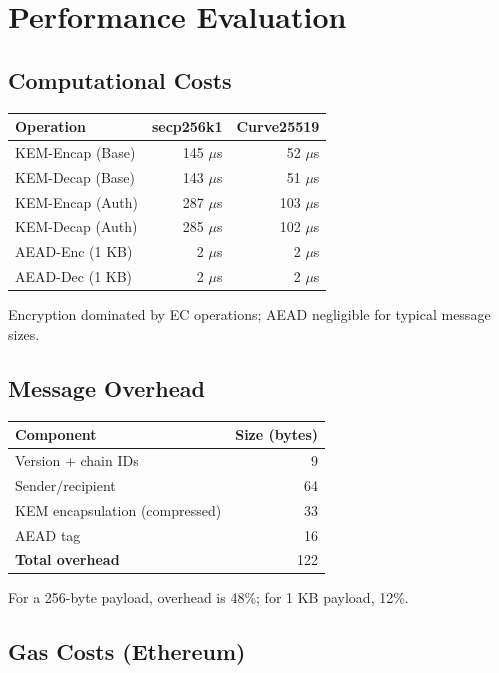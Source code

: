 \documentclass[11pt,a4paper]{article}
\begin{document}
\section{Performance Evaluation}

\subsection{Computational Costs}

\begin{center}
\begin{tabular}{|l|r|r|}
\hline
\textbf{Operation} & \textbf{secp256k1} & \textbf{Curve25519} \\
\hline
KEM-Encap (Base) & 145 $\mu$s & 52 $\mu$s \\
KEM-Decap (Base) & 143 $\mu$s & 51 $\mu$s \\
KEM-Encap (Auth) & 287 $\mu$s & 103 $\mu$s \\
KEM-Decap (Auth) & 285 $\mu$s & 102 $\mu$s \\
AEAD-Enc (1 KB) & 2 $\mu$s & 2 $\mu$s \\
AEAD-Dec (1 KB) & 2 $\mu$s & 2 $\mu$s \\
\hline
\end{tabular}
\end{center}

Encryption dominated by EC operations; AEAD negligible for typical message sizes.

\subsection{Message Overhead}

\begin{center}
\begin{tabular}{|l|r|}
\hline
\textbf{Component} & \textbf{Size (bytes)} \\
\hline
Version + chain IDs & 9 \\
Sender/recipient & 64 \\
KEM encapsulation (compressed) & 33 \\
AEAD tag & 16 \\
\hline
\textbf{Total overhead} & 122 \\
\hline
\end{tabular}
\end{center}

For a 256-byte payload, overhead is 48\%; for 1 KB payload, 12\%.

\subsection{Gas Costs (Ethereum)}
\end{document}
